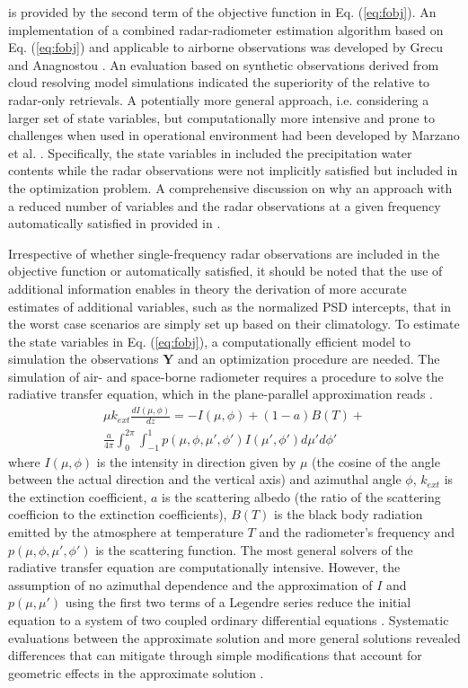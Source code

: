 \documentclass[10pt]{ietbook}
\begin{document}
is provided by the second term of the objective function in Eq. (\ref{eq:fobj}). An implementation of a combined radar-radiometer estimation
algorithm based on Eq. (\ref{eq:fobj}) and applicable to airborne observations was developed by Grecu and Anagnostou \cite{grecu2002}.
An evaluation based on synthetic observations derived from cloud resolving model simulations indicated the superiority of the relative
to radar-only retrievals.  A potentially more general approach, i.e. considering a larger set of state variables, but computationally 
more intensive and prone to challenges when used in operational environment had been developed by Marzano et al. \cite{marzano1999}.
Specifically, the state variables in \cite{marzano1999} included the precipitation water contents while the radar observations were 
not implicitly satisfied but included in the optimization problem.  A comprehensive discussion on why an approach with a reduced number
of variables and the radar observations at a given frequency automatically satisfied in provided in \cite{grecu2002}.

Irrespective of whether single-frequency radar observations are included in the objective function or automatically satisfied, it should
be noted that the use of additional information enables in theory the derivation of more accurate estimates of additional variables, such
as the normalized PSD intercepts, that in the worst case scenarios are simply set up based on their climatology. To estimate the state
variables in Eq. (\ref{eq:fobj}), a computationally efficient model to simulation the observations $\mathbf{Y}$ and an optimization procedure
are needed.  The simulation of air- and space-borne radiometer requires a procedure to solve the radiative transfer equation, which
in the plane-parallel approximation reads \cite{kummerow1993}.
\begin{multline}\label{eq:rte}
\mu k_{ext}\frac {dI(\mu,\phi)}{dz}=-I(\mu,\phi) + (1-a)B(T)+\\
\frac {a} {4\pi} \int_0^{2\pi}\int_{-1}^{1}p(\mu,\phi,\mu',\phi')I(\mu',\phi')d\mu'd\phi'
\end{multline}
where $I(\mu,\phi)$ is the intensity in direction given by $\mu$ (the cosine of the angle between the actual direction and 
the vertical axis) and azimuthal angle $\phi$, $k_{ext}$ is the extinction coefficient, $a$ is the scattering albedo (the ratio
of the scattering coefficion to the extinction coefficients), $B(T)$ is the black body radiation emitted by the atmosphere at 
temperature $T$ and the radiometer's frequency and $p(\mu,\phi,\mu',\phi')$ is the scattering function. The most general solvers
of the radiative transfer equation are computationally intensive.  However, the assumption of no azimuthal dependence and the
approximation of $I$ and $p(\mu,\mu')$ using the first two terms of a Legendre series \cite{kummerow1993} reduce the initial equation
to a system of two coupled ordinary differential equations \cite{kummerow1993}.  Systematic evaluations between the approximate solution
and more general solutions revealed differences that can mitigate through simple modifications that account for geometric effects in
the approximate solution \cite{liu1996}.
\end{document}

